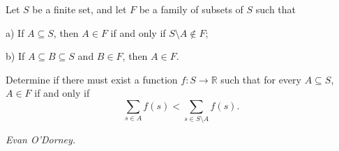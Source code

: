 Let $S$ be a finite set, and let $F$ be a family of subsets of $S$ such that

a) If $A\subseteq S$, then $A\in F$ if and only if $S\setminus A\notin F$;

b) If $A\subseteq B\subseteq S$ and $B\in F$, then $A\in F$.

Determine if there must exist a function $f:S\to\mathbb{R}$ such that for every $A\subseteq S$, $A\in F$ if and only if
\[\sum_{s\in A}f(s)<\sum_{s\in S\setminus A}f(s).\]

\textit{Evan O'Dorney.}